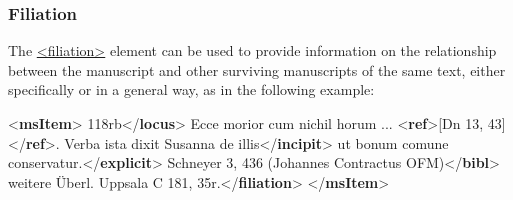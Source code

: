 \subsubsection[{Filiation}]{Filiation}\label{msfil}\par
The \hyperref[TEI.filiation]{<filiation>} element can be used to provide information on the relationship between the manuscript and other surviving manuscripts of the same text, either specifically or in a general way, as in the following example: \par\bgroup{}\exampleFont \begin{shaded}\noindent\mbox{}{<\textbf{msItem}>}\mbox{}\newline 
{}118rb{</\textbf{locus}>}\mbox{}\newline 
{}Ecce morior cum nichil horum ... {<\textbf{ref}>}[Dn 13, 43]{</\textbf{ref}>}. Verba ista\mbox{}\newline 
\hspace*{1em}\hspace*{1em} dixit Susanna de illis{</\textbf{incipit}>}\mbox{}\newline 
{}ut bonum comune conservatur.{</\textbf{explicit}>}\mbox{}\newline 
{}Schneyer 3, 436 (Johannes Contractus OFM){</\textbf{bibl}>}\mbox{}\newline 
{}weitere Überl. Uppsala C 181, 35r.{</\textbf{filiation}>}\mbox{}\newline 
{</\textbf{msItem}>}\end{shaded}\egroup\par 
